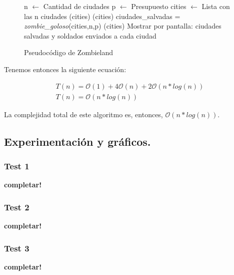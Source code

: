 \begin{figure}[!ht]
\begin{codebox}
\li n $\leftarrow$ Cantidad de ciudades
\li p $\leftarrow$ Presupuesto
\li cities $\leftarrow$ Lista con las n ciudades
(cities)
(cities)
\li ciudades_salvadas = {\it zombie_goloso}(cities,n,p)
(cities)
\li Mostrar por pantalla: ciudades salvadas y soldados enviados a cada ciudad
\end{codebox}
\caption{Pseudocódigo de Zombieland}\label{code:zombieland}
\end{figure}
\FloatBarrier

Tenemos entonces la siguiente ecuación:

\begin{equation*}
\begin{array}{l}
T(n) = \mathcal{O}(1) + 4\mathcal{O}(n) + 2\mathcal{O}(n*log(n))\\
T(n) = \mathcal{O}(n*log(n))
\end{array}
\end{equation*}

La complejidad total de este algoritmo es, entonces, $\mathcal{O}(n*log(n))$.


\newpage
\subsection{Experimentación y gráficos.}

\vspace*{0.3cm}

\subsubsection{Test 1}

\vspace*{0.3cm}

\textbf{completar!}


\newpage
\subsubsection{Test 2}

\vspace*{0.3cm}

\textbf{completar!}


\newpage
\subsubsection{Test 3}

\vspace*{0.3cm}

\textbf{completar!}
